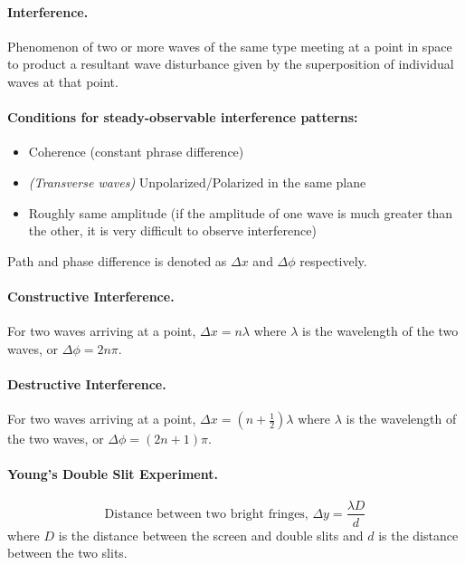 \documentclass{article}
\begin{document}
\paragraph{Interference.} Phenomenon of two or more waves of the same type meeting at a point in space to product a resultant wave disturbance given by the superposition of individual waves at that point.

\paragraph{Conditions for steady-observable interference patterns:} \begin{itemize}
\item Coherence (constant phrase difference)
\item \textit{(Transverse waves)} Unpolarized/Polarized in the same plane
\item Roughly same amplitude (if the amplitude of one wave is much greater than the other, it is very difficult to observe interference)
\end{itemize}

Path and phase difference is denoted as $\Delta x$ and $\Delta \phi$ respectively.

\paragraph{Constructive Interference.} For two waves arriving at a point, $\Delta x = n\lambda$ where $\lambda$ is the wavelength of the two waves, or $\Delta\phi = 2n\pi$.

\paragraph{Destructive Interference.} For two waves arriving at a point, $\Delta x = \left(n + \frac{1}{2}\right)\lambda$ where $\lambda$ is the wavelength of the two waves, or $\Delta\phi = (2n + 1)\pi$.

\paragraph{Young's Double Slit Experiment.} \begin{equation}
\text{Distance between two bright fringes, } \Delta y = \frac{\lambda D}{d}
\end{equation} where $D$ is the distance between the screen and double slits and $d$ is the distance between the two slits.
\end{document}
